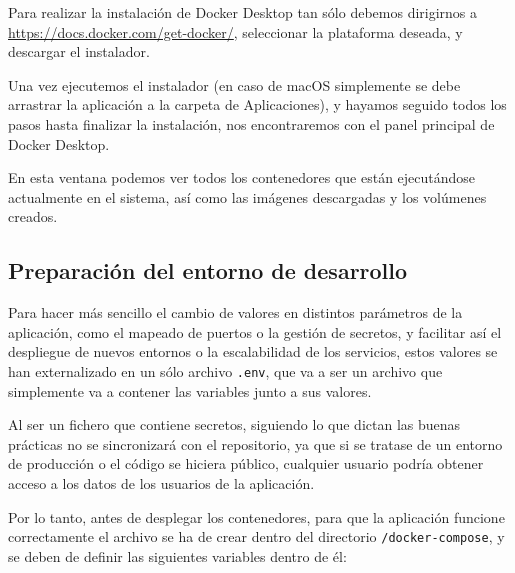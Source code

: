 
Para realizar la instalación de Docker Desktop tan sólo debemos dirigirnos a \url{https://docs.docker.com/get-docker/}, seleccionar la plataforma deseada, y descargar el instalador.


Una vez ejecutemos el instalador (en caso de macOS simplemente se debe arrastrar la aplicación a la carpeta de Aplicaciones), y hayamos seguido todos los pasos hasta finalizar la instalación, nos encontraremos con el panel principal de Docker Desktop. 


En esta ventana podemos ver todos los contenedores que están ejecutándose actualmente en el sistema, así como las imágenes descargadas y los volúmenes creados.

\subsection{Preparación del entorno de desarrollo} \label{entorno-desarrollo}

Para hacer más sencillo el cambio de valores en distintos parámetros de la aplicación, como el mapeado de puertos o la gestión de secretos, y facilitar así el despliegue de nuevos entornos o la escalabilidad de los servicios, estos valores se han externalizado en un sólo archivo \verb,.env,, que va a ser un archivo que simplemente va a contener las variables junto a sus valores. 

Al ser un fichero que contiene secretos, siguiendo lo que dictan las buenas prácticas no se sincronizará con el repositorio, ya que si se tratase de un entorno de producción o el código se hiciera público, cualquier usuario podría obtener acceso a los datos de los usuarios de la aplicación.

Por lo tanto, antes de desplegar los contenedores, para que la aplicación funcione correctamente el archivo se ha de crear dentro del directorio \verb,/docker-compose,, y se deben de definir las siguientes variables dentro de él:

